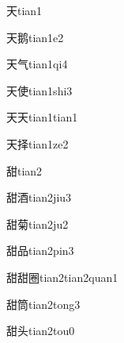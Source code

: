 \begin{verbete}[4]{天}{tian1}
\end{verbete}

\begin{verbete}[4;12]{天鹅}{tian1e2}
\end{verbete}

\begin{verbete}[4;4]{天气}{tian1qi4}
\end{verbete}

\begin{verbete}[4;8]{天使}{tian1shi3}
\end{verbete}

\begin{verbete}[4;4]{天天}{tian1tian1}
\end{verbete}

\begin{verbete}[4;8]{天择}{tian1ze2}
\end{verbete}

\begin{verbete}[11]{甜}{tian2}
\end{verbete}

\begin{verbete}[11;10]{甜酒}{tian2jiu3}
\end{verbete}

\begin{verbete}[11;11]{甜菊}{tian2ju2}
\end{verbete}

\begin{verbete}[11;9]{甜品}{tian2pin3}
\end{verbete}

\begin{verbete}[11;11;11]{甜甜圈}{tian2tian2quan1}
\end{verbete}

\begin{verbete}[11;12]{甜筒}{tian2tong3}
\end{verbete}

\begin{verbete}[11;5]{甜头}{tian2tou0}
\end{verbete}

